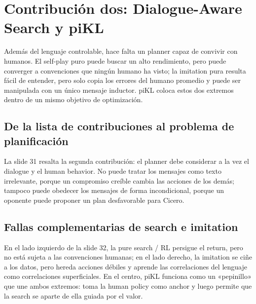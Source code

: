 \section{Contribución dos: Dialogue-Aware Search y piKL}

Además del lenguaje controlable, hace falta un planner capaz de convivir con humanos. El self-play puro puede buscar un alto rendimiento, pero puede converger a convenciones que ningún humano ha visto; la imitation pura resulta fácil de entender, pero solo copia los errores del humano promedio y puede ser manipulada con un único mensaje inductor. piKL coloca estos dos extremos dentro de un mismo objetivo de optimización.

\subsection{De la lista de contribuciones al problema de planificación}

La slide 31 resalta la segunda contribución: el planner debe considerar a la vez el dialogue y el human behavior. No puede tratar los mensajes como texto irrelevante, porque un compromiso creíble cambia las acciones de los demás; tampoco puede obedecer los mensajes de forma incondicional, porque un oponente puede proponer un plan desfavorable para Cicero.


\subsection{Fallas complementarias de search e imitation}

En el lado izquierdo de la slide 32, la pure search / RL persigue el return, pero no está sujeta a las convenciones humanas; en el lado derecho, la imitation se ciñe a los datos, pero hereda acciones débiles y aprende las correlaciones del lenguaje como correlaciones superficiales. En el centro, piKL funciona como un «pepinillo» que une ambos extremos: toma la human policy como anchor y luego permite que la search se aparte de ella guiada por el valor.


